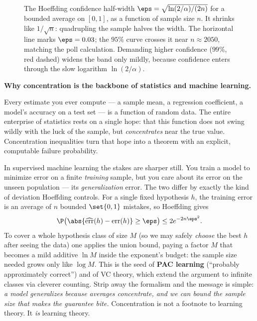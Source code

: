 \begin{figure}[H]
\centering
{}
\caption{The Hoeffding confidence half-width $\eps=\sqrt{\ln(2/\alpha)/(2n)}$
for a bounded average on $[0,1]$, as a function of sample size $n$. It shrinks
like $1/\sqrt n$: quadrupling the sample halves the width. The horizontal line
marks $\eps=0.03$; the $95\%$ curve crosses it near $n\approx 2050$, matching
the poll calculation. Demanding higher confidence ($99\%$, red dashed) widens
the band only mildly, because confidence enters through the slow logarithm
$\ln(2/\alpha)$.}
\label{ch19:fig-hoeffding}
\end{figure}

\begin{applicationbox}
\textbf{Why concentration is the backbone of statistics and machine learning.}

Every estimate you ever compute --- a sample mean, a regression coefficient,
a model's accuracy on a test set --- is a function of random data. The entire
enterprise of statistics rests on a single hope: that this function does not
swing wildly with the luck of the sample, but \emph{concentrates} near the
true value. Concentration inequalities turn that hope into a theorem with an
explicit, computable failure probability.

In supervised machine learning the stakes are sharper still. You train a model
to minimize error on a finite \emph{training} sample, but you care about its
error on the unseen population --- its \emph{generalization} error. The two
differ by exactly the kind of deviation Hoeffding controls. For a single fixed
hypothesis $h$, the training error is an average of $n$ bounded $\set{0,1}$
mistakes, so Hoeffding gives
\[
  \P\bigl(\abs{\widehat{\mathrm{err}}(h) - \mathrm{err}(h)} \ge \eps\bigr)
  \le 2 e^{-2n\eps^2}.
\]
To cover a whole hypothesis class of size $M$ (so we may safely \emph{choose}
the best $h$ after seeing the data) one applies the union bound, paying a
factor $M$ that becomes a mild additive $\ln M$ inside the exponent's budget:
the sample size needed grows only like $\log M$. This is the seed of
\textbf{PAC learning} (``probably approximately correct'') and of VC theory,
which extend the argument to infinite classes via cleverer counting. Strip
away the formalism and the message is simple: \emph{a model generalizes
because averages concentrate, and we can bound the sample size that makes the
guarantee bite.} Concentration is not a footnote to learning theory. It
\emph{is} learning theory.
\end{applicationbox}

